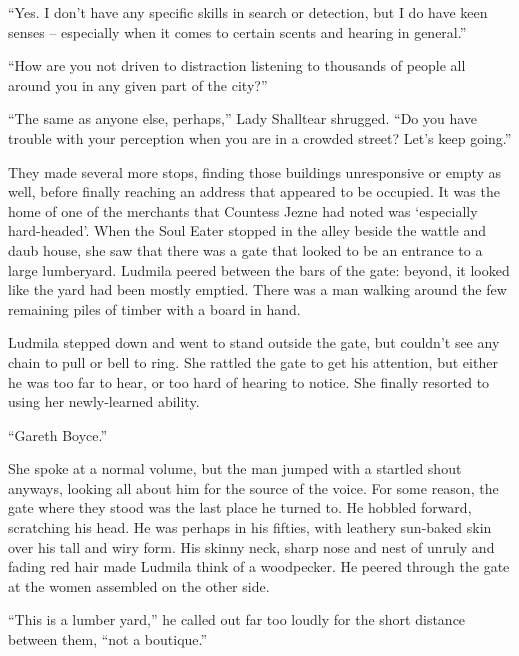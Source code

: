  

“Yes. I don’t have any specific skills in search or detection, but I do have keen senses – especially when it comes to certain scents and hearing in general.”

 

“How are you not driven to distraction listening to thousands of people all around you in any given part of the city?”

 

“The same as anyone else, perhaps,” Lady Shalltear shrugged. “Do you have trouble with your perception when you are in a crowded street? Let’s keep going.”

 

They made several more stops, finding those buildings unresponsive or empty as well, before finally reaching an address that appeared to be occupied. It was the home of one of the merchants that Countess Jezne had noted was ‘especially hard-headed’. When the Soul Eater stopped in the alley beside the wattle and daub house, she saw that there was a gate that looked to be an entrance to a large lumberyard. Ludmila peered between the bars of the gate: beyond, it looked like the yard had been mostly emptied. There was a man walking around the few remaining piles of timber with a board in hand.

 

Ludmila stepped down and went to stand outside the gate, but couldn’t see any chain to pull or bell to ring. She rattled the gate to get his attention, but either he was too far to hear, or too hard of hearing to notice. She finally resorted to using her newly-learned ability.

 

“Gareth Boyce.”

 

She spoke at a normal volume, but the man jumped with a startled shout anyways, looking all about him for the source of the voice. For some reason, the gate where they stood was the last place he turned to. He hobbled forward, scratching his head. He was perhaps in his fifties, with leathery sun-baked skin over his tall and wiry form. His skinny neck, sharp nose and nest of unruly and fading red hair made Ludmila think of a woodpecker. He peered through the gate at the women assembled on the other side.

 

“This is a lumber yard,” he called out far too loudly for the short distance between them, “not a boutique.”

